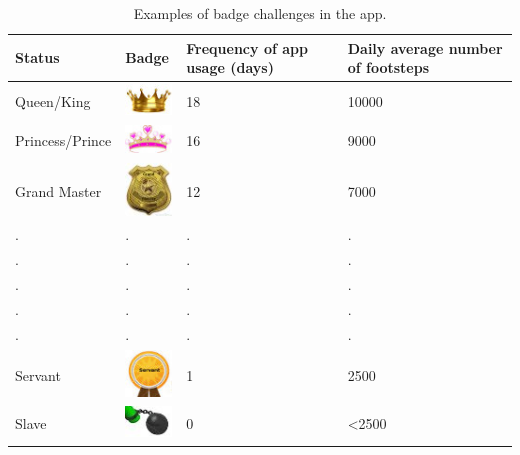 \begin{table}[h!]
  \begin{center}
    \caption{Examples of badge challenges in the app.}
    \label{table:badges}
	\begin{tabular}{|l|l|p{3cm}|p{4cm}|}
		\hline
		Status &Badge &Frequency of app usage (days)&Daily average number of footsteps\\
		\hline
		Queen/King&\includegraphics[scale = 0.75]{Figures/badges/king.jpg}&18&10000\\
		\hline
		Princess/Prince&\includegraphics[scale = 0.75]{Figures/badges/prince.jpg}&16&9000\\
		\hline
				Grand Master&\includegraphics[scale = 0.75]{Figures/badges/grandmaster.jpg}&12&7000\\
		\hline
		 .&.&.&. \\ 
		 .&.&.&. \\   
		 .&.&.&. \\ 
		 .&.&.&. \\
		 .&.&.&. \\
		 \hline
		Servant&\includegraphics[scale = 0.75]{Figures/badges/servant.jpg}&1&2500\\
		\hline
		Slave&\includegraphics[scale = 0.75]{Figures/badges/slave.jpg}&0&\textless 2500\\
		\hline
	\end{tabular}
  \end{center}
\end{table} 

